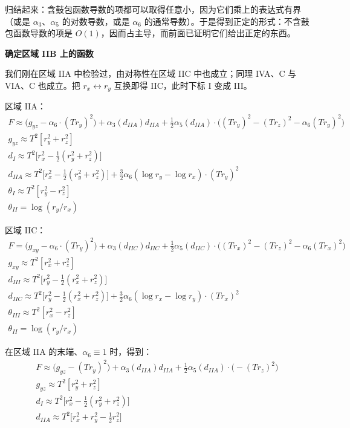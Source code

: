 归结起来：含鼓包函数导数的项都可以取得任意小，因为它们乘上的表达式有界（或是 $\alpha_3$、$\alpha_5$ 的对数导数，或是 $\alpha_6$ 的通常导数）。于是得到正定的形式：不含鼓包函数导数的项是 $O(1)$，因而占主导，而前面已证明它们给出正定的东西。

\medskip
\noindent\textbf{确定区域 IIB 上的函数}\par
我们刚在区域 IIA 中检验过，由对称性在区域 IIC 中也成立；同理 IVA、C 与 VIA、C 也成立。把 $r_x\leftrightarrow r_y$ 互换即得 IIC，此时下标 I 变成 III。

区域 IIA：
\begin{gather*}
F\approx\big(g_{yz}-\alpha_6\cdot(Tr_y)^2\big)+\alpha_3(d_{IIA})d_{IIA}
+\frac12\alpha_5(d_{IIA})\cdot\big((Tr_y)^2-(Tr_z)^2-\alpha_6(Tr_y)^2\big)\\
g_{yz}\approx T^2[r_y^2+r_z^2]\\
d_I\approx T^2\Big[r_x^2-\frac12(r_y^2+r_z^2)\Big]\\
d_{IIA}\approx T^2\Big[r_x^2-\frac12(r_y^2+r_z^2)\Big]+\frac32\alpha_6(\log r_y-\log r_x)\cdot(Tr_y)^2\\
\theta_I\approx T^2[r_y^2-r_z^2]\\
\theta_{II}=\log(r_y/r_x)
\end{gather*}

区域 IIC：
\begin{gather*}
F=\big(g_{xy}-\alpha_6\cdot(Tr_y)^2\big)+\alpha_3(d_{IIC})d_{IIC}
+\frac12\alpha_5(d_{IIC})\cdot\big((Tr_x)^2-(Tr_z)^2-\alpha_6(Tr_x)^2\big)\\
g_{xy}\approx T^2[r_x^2+r_z^2]\\
d_{III}\approx T^2\Big[r_y^2-\frac12(r_x^2+r_z^2)\Big]\\
d_{IIC}\approx T^2\Big[r_y^2-\frac12(r_x^2+r_z^2)\Big]+\frac32\alpha_6(\log r_x-\log r_y)\cdot(Tr_x)^2\\
\theta_{III}\approx T^2[r_x^2-r_z^2]\\
\theta_{II}=\log(r_y/r_x)
\end{gather*}

在区域 IIA 的末端、$\alpha_6\equiv1$ 时，得到：
\begin{gather*}
F\approx\big(g_{yz}-(Tr_y)^2\big)+\alpha_3(d_{IIA})d_{IIA}+\frac12\alpha_5(d_{IIA})\cdot\big(-(Tr_z)^2\big)\\
g_{yz}\approx T^2[r_y^2+r_z^2]\\
d_I\approx T^2\Big[r_x^2-\frac12(r_y^2+r_z^2)\Big]\\
d_{IIA}\approx T^2\Big[r_x^2+r_y^2-\frac12r_z^2\Big]
\end{gather*}

